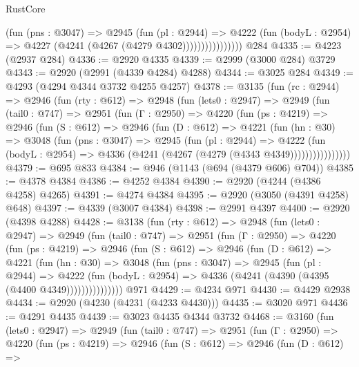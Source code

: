 \begin{lexlean}{RustCore}
\begin{coremodule}
                        (fun (pns : @3047) =>
                        @2945
                          (fun (pl : @2944) =>
                          @4222
                            (fun (bodyL : @2954) => @4227 (@4241 (@4267 (@4279 @4302))))))))))))))))
    @284
@4335 := @4223 (@2937 @284)
@4336 := @2920 @4335
@4339 := @2999 (@3000 @284) @3729
@4343 := @2920 (@2991 (@4339 @4284) @4288)
@4344 := @3025 @284
@4349 := @4293 (@4294 @4344 @3732 @4255 @4257)
@4378 := @3135
    (fun (rc : @2944) =>
    @2946
      (fun (rty : @612) =>
      @2948
        (fun (lets0 : @2947) =>
        @2949
          (fun (tail0 : @747) =>
          @2951
            (fun (Γ : @2950) =>
            @4220
              (fun (ps : @4219) =>
              @2946
                (fun (S : @612) =>
                @2946
                  (fun (D : @612) =>
                  @4221
                    (fun (hn : @30) =>
                    @3048
                      (fun (pns : @3047) =>
                      @2945
                        (fun (pl : @2944) =>
                        @4222
                          (fun (bodyL : @2954) =>
                          @4336 (@4241 (@4267 (@4279 (@4343 @4349))))))))))))))))
@4379 := @695 @833
@4384 := @946 (@1143 (@694 (@4379 @606) @704))
@4385 := @4378 @4384
@4386 := @4252 @4384
@4390 := @2920 (@4244 (@4386 @4258) @4265)
@4391 := @4274 @4384
@4395 := @2920 (@3050 (@4391 @4258) @648)
@4397 := @4339 (@3007 @4384)
@4398 := @2991 @4397
@4400 := @2920 (@4398 @4288)
@4428 := @3138
    (fun (rty : @612) =>
    @2948
      (fun (lets0 : @2947) =>
      @2949
        (fun (tail0 : @747) =>
        @2951
          (fun (Γ : @2950) =>
          @4220
            (fun (ps : @4219) =>
            @2946
              (fun (S : @612) =>
              @2946
                (fun (D : @612) =>
                @4221
                  (fun (hn : @30) =>
                  @3048
                    (fun (pns : @3047) =>
                    @2945
                      (fun (pl : @2944) =>
                      @4222
                        (fun (bodyL : @2954) =>
                        @4336 (@4241 (@4390 (@4395 (@4400 @4349)))))))))))))))
    @971
@4429 := @4234 @971
@4430 := @4429 @2938
@4434 := @2920 (@4230 (@4231 (@4233 @4430)))
@4435 := @3020 @971
@4436 := @4291 @4435
@4439 := @3023 @4435 @4344 @3732
@4468 := @3160
    (fun (lets0 : @2947) =>
    @2949
      (fun (tail0 : @747) =>
      @2951
        (fun (Γ : @2950) =>
        @4220
          (fun (ps : @4219) =>
          @2946
            (fun (S : @612) =>
            @2946
              (fun (D : @612) =>

\end{coremodule}
\end{lexlean}
